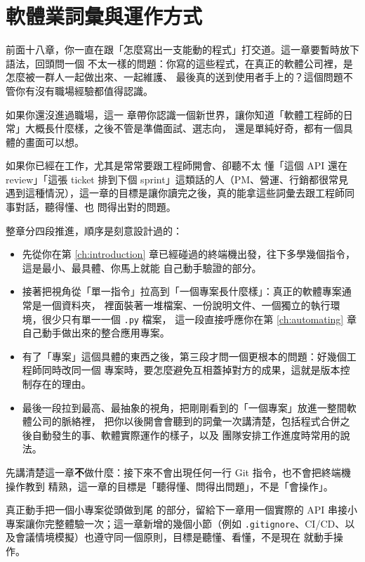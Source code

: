 \chapter{軟體業詞彙與運作方式}
\label{ch:industry}

前面十八章，你一直在跟「怎麼寫出一支能動的程式」打交道。這一章要暫時放下語法，回頭問一個
不太一樣的問題：你寫的這些程式，在真正的軟體公司裡，是怎麼被一群人一起做出來、一起維護、
最後真的送到使用者手上的？這個問題不管你有沒有職場經驗都值得認識。

如果你還沒進過職場，這一
章帶你認識一個新世界，讓你知道「軟體工程師的日常」大概長什麼樣，之後不管是準備面試、選志向，
還是單純好奇，都有一個具體的畫面可以想。

如果你已經在工作，尤其是常常要跟工程師開會、卻聽不太
懂「這個 API 還在 review」「這張 ticket 排到下個 sprint」這類話的人（PM、營運、行銷都很常見
遇到這種情況），這一章的目標是讓你讀完之後，真的能拿這些詞彙去跟工程師同事對話，聽得懂、也
問得出對的問題。

整章分四段推進，順序是刻意設計過的：

\begin{itemize}
\item 先從你在第 \ref{ch:introduction} 章已經碰過的終端機出發，往下多學幾個指令，這是最小、最具體、你馬上就能
自己動手驗證的部分。
\item 接著把視角從「單一指令」拉高到「一個專案長什麼樣」：真正的軟體專案通常是一個資料夾，
裡面裝著一堆檔案、一份說明文件、一個獨立的執行環境，很少只有單一一個 \texttt{.py} 檔案，
這一段直接呼應你在第 \ref{ch:automating} 章自己動手做出來的整合應用專案。
\item 有了「專案」這個具體的東西之後，第三段才問一個更根本的問題：好幾個工程師同時改同一個
專案時，要怎麼避免互相蓋掉對方的成果，這就是版本控制存在的理由。
\item 最後一段拉到最高、最抽象的視角，把剛剛看到的「一個專案」放進一整間軟體公司的脈絡裡，
把你以後開會會聽到的詞彙一次講清楚，包括程式合併之後自動發生的事、軟體實際運作的樣子，以及
團隊安排工作進度時常用的說法。
\end{itemize}

先講清楚這一章\textbf{不}做什麼：接下來不會出現任何一行 Git 指令，也不會把終端機操作教到
精熟，這一章的目標是「聽得懂、問得出問題」，不是「會操作」。

真正動手把一個小專案從頭做到尾
的部分，留給下一章用一個實際的 API 串接小專案讓你完整體驗一次；這一章新增的幾個小節（例如
\texttt{.gitignore}、CI/CD、以及會議情境模擬）也遵守同一個原則，目標是聽懂、看懂，不是現在
就動手操作。

